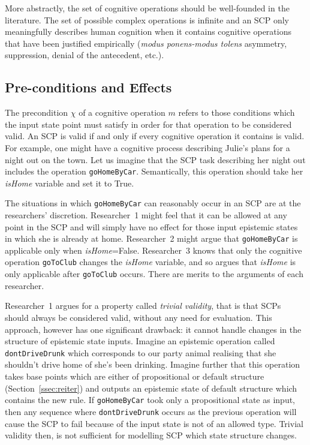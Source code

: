More abstractly, the set of cognitive operations should be well-founded in the literature. The set of possible complex operations is infinite and an SCP only meaningfully describes human cognition when it contains cognitive operations that have been justified empirically (\textit{modus ponens-modus tolens} asymmetry, suppression, denial of the antecedent, etc.). 

\subsection{Pre-conditions and Effects} \label{ssec:precond}
The precondition $\chi$ of a cognitive operation $m$ refers to those conditions which the input state point must satisfy in order for that operation to be considered valid. An SCP is valid if and only if every cognitive operation it contains is valid. For example, one might have a cognitive process describing Julie's plans for a night out on the town. Let us imagine that the SCP task describing her night out includes the operation \texttt{goHomeByCar}. Semantically, this operation should take her \textit{isHome} variable and set it to True.

The situations in which \texttt{goHomeByCar} can reasonably occur in an SCP are at the researchers' discretion. Researcher~1 might feel that it can be allowed at any point in the SCP and will simply have no effect for those input epistemic states in which she is already at home. Researcher~2 might argue that \texttt{goHomeByCar} is applicable only when \textit{isHome}=False. Researcher~3 knows that only the cognitive operation \texttt{goToClub} changes the \textit{isHome} variable, and so argues that \textit{isHome} is only applicable after \texttt{goToClub} occurs. There are merits to the arguments of each researcher.

Researcher~1 argues for a property called \textit{trivial validity}, that is that SCPs should always be considered valid, without any need for evaluation. This approach, however has one significant drawback: it cannot handle changes in the structure of epistemic state inputs. Imagine an epistemic operation called \texttt{dontDriveDrunk} which corresponds to our party animal realising that she shouldn't drive home of she's been drinking. Imagine further that this operation takes base points which are either of propositional or default structure (Section~\ref{ssec:reiter}) and outputs an epistemic state of default structure which contains the new rule. If \texttt{goHomeByCar} took only a propositional state as input, then any sequence where \texttt{dontDriveDrunk} occurs as the previous operation will cause the SCP to fail because of the input state is not of an allowed type. Trivial validity then, is not sufficient for modelling SCP which state structure changes.

